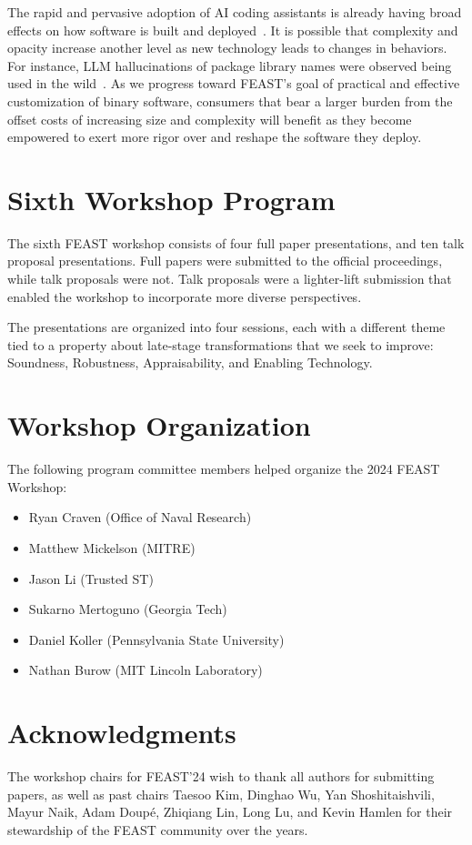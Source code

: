 \documentclass[sigconf]{acmart}
\begin{document}
The rapid and pervasive adoption of AI coding assistants is already having broad
effects on how software is built and deployed~\cite{klemmer2024}.  It is
possible that complexity and opacity increase another level as new technology
leads to changes in behaviors.  For instance, LLM hallucinations of package
library names were observed being used in the wild~\cite{lanyado2024}. As we
progress toward FEAST's goal of practical and effective customization of binary
software, consumers that bear a larger burden from the offset costs of
increasing size and complexity will benefit as they become empowered to exert
more rigor over and reshape the software they deploy.

\section{Sixth Workshop Program}
The sixth FEAST workshop consists of four full paper presentations, and ten talk
proposal presentations.  Full papers were submitted to the official proceedings, while
talk proposals were not.  Talk proposals were a lighter-lift submission that enabled
the workshop to incorporate more diverse perspectives.

The presentations are organized into four sessions, each with a different theme
tied to a property about late-stage transformations that we seek to improve:
Soundness, Robustness, Appraisability, and Enabling Technology.

\section{Workshop Organization}
The following program committee members helped organize the 2024 FEAST Workshop:
\begin{itemize}
  \item Ryan Craven (Office of Naval Research)
  \item Matthew Mickelson (MITRE)
  \item Jason Li (Trusted ST)
  \item Sukarno Mertoguno (Georgia Tech)
  \item Daniel Koller (Pennsylvania State University)
  \item Nathan Burow (MIT Lincoln Laboratory)
\end{itemize}

\section{Acknowledgments}
The workshop chairs for FEAST'24 wish to thank all authors for submitting papers,
as well as past chairs
Taesoo Kim, Dinghao Wu,
Yan Shoshitaishvili, Mayur Naik,
Adam Doup\'e, Zhiqiang Lin,
Long Lu, and Kevin Hamlen
for their stewardship of the FEAST community over the years.


\balance

\end{document}
